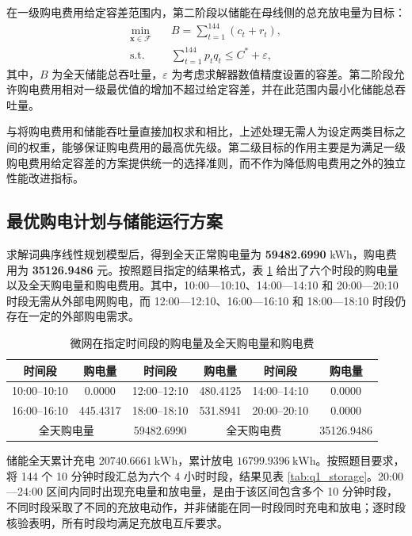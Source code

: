 \documentclass[12pt,a4paper]{ctexart}
\renewcommand{\textbf}[1]{{\CJKfamily{heiti}\bfseries #1}}
\begin{document}
\par\noindent\hspace*{2em}在一级购电费用给定容差范围内，第二阶段以储能在母线侧的总充放电量为目标：
\begin{equation}
\begin{aligned}
\min_{\boldsymbol{x}\in\mathcal{F}}\quad & B=\sum_{t=1}^{144}(c_t+r_t),\\
\text{s.t.}\quad & \sum_{t=1}^{144}p_tq_t\leq C^{*}+\varepsilon,
\end{aligned}
\end{equation}
其中，$B$ 为全天储能总吞吐量，$\varepsilon$ 为考虑求解器数值精度设置的容差。第二阶段允许购电费用相对一级最优值的增加不超过给定容差，并在此范围内最小化储能总吞吐量。

\par\noindent\hspace*{2em}与将购电费用和储能吞吐量直接加权求和相比，上述处理无需人为设定两类目标之间的权重，能够保证购电费用的最高优先级。第二级目标的作用主要是为满足一级购电费用给定容差的方案提供统一的选择准则，而不作为降低购电费用之外的独立性能改进指标。
\subsection{最优购电计划与储能运行方案}
求解词典序线性规划模型后，得到全天正常购电量为 \textbf{59482.6990} kWh，购电费用为 \textbf{35126.9486} 元。按照题目指定的结果格式，表 \ref{tab:q1_purchase} 给出了六个时段的购电量以及全天购电量和购电费用。其中，10:00—10:10、14:00—14:10 和 20:00—20:10 时段无需从外部电网购电，而 12:00—12:10、16:00—16:10 和 18:00—18:10 时段仍存在一定的外部购电需求。

\begin{table}[htbp]
\centering
\caption{微网在指定时间段的购电量及全天购电量和购电费}
\label{tab:q1_purchase}
\begin{tabular}{|c|c|c|c|c|c|}
\hline
时间段 & 购电量 & 时间段 & 购电量 & 时间段 & 购电量 \\
\hline
10:00--10:10 & 0.0000 & 12:00--12:10 & 480.4125 & 14:00--14:10 & 0.0000 \\
\hline
16:00--16:10 & 445.4317 & 18:00--18:10 & 531.8941 & 20:00--20:10 & 0.0000 \\
\hline
\multicolumn{2}{|c|}{全天购电量} & \multicolumn{1}{c|}{59482.6990} & \multicolumn{2}{c|}{全天购电费} & 35126.9486 \\
\hline
\end{tabular}
\end{table}

\par\noindent\hspace*{2em}储能全天累计充电 $20740.6661\ \mathrm{kWh}$，累计放电 $16799.9396\ \mathrm{kWh}$。按照题目要求，将 144 个 10 分钟时段汇总为六个 4 小时时段，结果见表 \ref{tab:q1_storage}。20:00—24:00 区间内同时出现充电量和放电量，是由于该区间包含多个 10 分钟时段，不同时段采取了不同的充放电动作，并非储能在同一时段同时充电和放电；逐时段核验表明，所有时段均满足充放电互斥要求。
\end{document}
